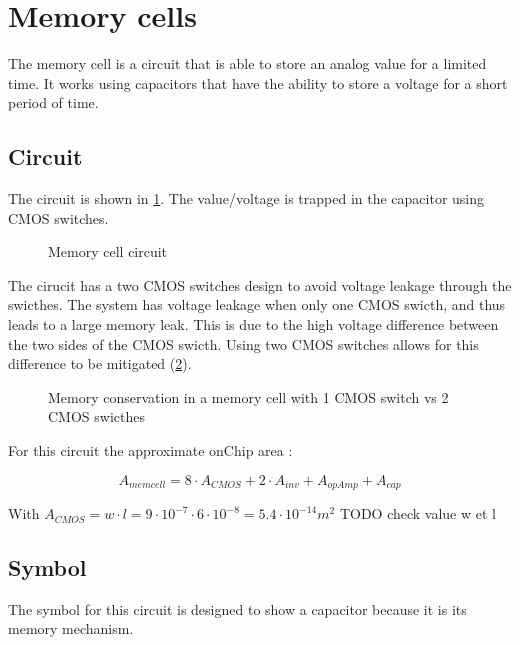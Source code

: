 \section{Memory cells}
\label{sec:memcell}

The memory cell is a circuit that is able to store an analog value for a limited time. It works using capacitors that have the ability to store a voltage for a short period of time.

\subsection{Circuit}

The circuit is shown in \cref{circt:memcell}. The value/voltage is trapped in the capacitor using \ac{CMOS} switches.

\begin{figure}[H]
  \centering
  
  \caption{Memory cell circuit}
  \label{circt:memcell}
\end{figure}

The cirucit has a two \ac{CMOS} switches design to avoid voltage leakage through the swicthes. The system has voltage leakage when only one \ac{CMOS} swicth, and thus leads to a large memory leak. This is due to the high voltage difference between the two sides of the \ac{CMOS} swicth. Using two \ac{CMOS} switches allows for this difference to be mitigated (\cref{fig:memcellLoss}).

\begin{figure}[H]
  \centering
  
  \caption{Memory conservation in a memory cell with 1 \ac{CMOS} switch vs 2 \ac{CMOS} swicthes}
  \label{fig:memcellLoss}
\end{figure}

For this circuit the approximate onChip area :

\begin{equation}
  A_{memcell}=8\cdot A_{CMOS}+2\cdot A_{inv}+A_{opAmp}+A_{cap}
\end{equation}

With $A_{CMOS} = w\cdot l = 9\cdot 10^{-7} \cdot 6 \cdot 10^{-8} = 5.4 \cdot 10^{-14} m^2$ TODO check value w et l

\subsection{Symbol}

The symbol for this circuit is designed to show a capacitor because it is its memory mechanism.

